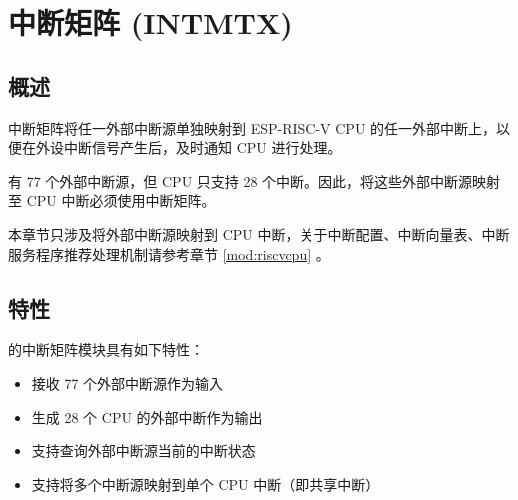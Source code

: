 \documentclass[main\_\_CN.tex]{subfiles}
\begin{document}

\ifglobal
\else
    {\let\clearpage\relax \listoftodos}
    {\let\clearpage\relax \listofdonetodos}
    \tableofcontents
\fi




\hypertarget{intmtrx}{}
\chapter{中断矩阵 (INTMTX)}
\label{mod:intmtrx}

\section{概述}

\chipname{} 中断矩阵将任一外部中断源单独映射到 ESP-RISC-V CPU 的任一外部中断上，以便在外设中断信号产生后，及时通知 CPU 进行处理。

\chipname{} 有 77 个外部中断源，但 CPU 只支持 28 个中断。因此，将这些外部中断源映射至 CPU 中断必须使用中断矩阵。

\begin{tiplisting}
本章节只涉及将外部中断源映射到 CPU 中断，关于中断配置、中断向量表、中断服务程序推荐处理机制请参考章节 \ref{mod:riscvcpu} \textit{}。
\end{tiplisting}
\vspace{-1em}

\section{特性}

\chipname{} 的中断矩阵模块具有如下特性：

\begin{itemize}
    \item 接收 77 个外部中断源作为输入
    \item 生成 28 个 CPU 的外部中断作为输出
    \item 支持查询外部中断源当前的中断状态
    \item 支持将多个中断源映射到单个 CPU 中断（即共享中断）
\end{itemize}
\end{document}
